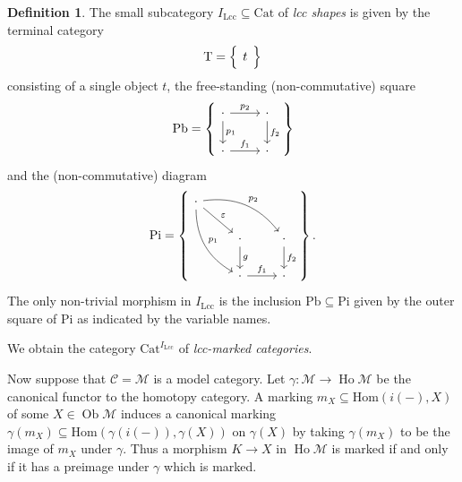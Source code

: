 \documentclass[a4paper]{article}
\theoremstyle{remark}
\theoremstyle{definition}
\newtheorem{definition}[theorem]{Definition}
\begin{document}
\begin{definition}
  The small subcategory $I_\mathrm{Lcc} \subseteq \mathrm{Cat}$ of \emph{lcc shapes} is given by the terminal category 
  \begin{equation}
    \mathrm{T} =
    \left\{
      \begin{tikzcd}
        t
      \end{tikzcd}
    \right\}
  \end{equation}
  consisting of a single object $t$, the free-standing (non-commutative) square
  \begin{equation}
    \mathrm{Pb} =
    \left\{
      \begin{tikzcd}
        \cdot \arrow[d, "p_1"] \arrow[r, "p_2"] & \cdot \arrow[d, "f_2"] \\
        \cdot \arrow[r, "f_1"] & \cdot
      \end{tikzcd}
    \right\}
  \end{equation}
  and the (non-commutative) diagram
  \begin{equation}
    \mathrm{Pi} =
    \left\{
      \begin{tikzcd}
        \cdot \arrow[ddr, bend right, "p_1"] \arrow[drr, bend left, "p_2"] \arrow[dr, "\varepsilon"] \\
        & \cdot \arrow[d, "g"] & \cdot \arrow[d, "f_2"] \\
        & \cdot \arrow[r, "f_1"] & \cdot
      \end{tikzcd}
    \right\}.
  \end{equation}
  The only non-trivial morphism in $I_\mathrm{Lcc}$ is the inclusion $\mathrm{Pb} \subseteq \mathrm{Pi}$ given by the outer square of $\mathrm{Pi}$ as indicated by the variable names.

  We obtain the category $\mathrm{Cat}^{I_\mathrm{Lcc}}$ of \emph{lcc-marked categories}.
\end{definition}

Now suppose that $\mathcal{C} = \mathcal{M}$ is a model category.
Let $\gamma : \mathcal{M} \rightarrow \operatorname{Ho} \mathcal{M}$ be the canonical functor to the homotopy category.
A marking $m_X \subseteq \mathrm{Hom}(i(-), X)$ of some $X \in \operatorname{Ob} \mathcal{M}$ induces a canonical marking $\gamma(m_X) \subseteq \mathrm{Hom}(\gamma(i(-)), \gamma(X))$ on $\gamma(X)$ by taking $\gamma(m_X)$ to be the image of $m_X$ under $\gamma$.
Thus a morphism $K \rightarrow X$ in $\operatorname{Ho} \mathcal{M}$ is marked if and only if it has a preimage under $\gamma$ which is marked.
\end{document}
